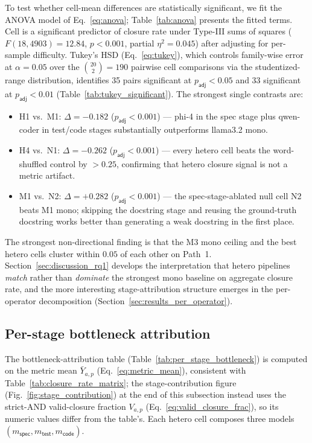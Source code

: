 

To test whether cell-mean differences are statistically significant, we fit the ANOVA model of Eq.~\ref{eq:anova}; Table~\ref{tab:anova} presents the fitted terms. Cell is a significant predictor of closure rate under Type-III sums of squares ($F(18, 4903) = 12.84$, $p < 0.001$, partial $\eta^2 = 0.045$) after adjusting for per-sample difficulty. Tukey's HSD (Eq.~\ref{eq:tukey}), which controls family-wise error at $\alpha = 0.05$ over the $\binom{20}{2} = 190$ pairwise cell comparisons via the studentized-range distribution, identifies 35 pairs significant at $p_{\textsf{adj}} < 0.05$ and 33 significant at $p_{\textsf{adj}} < 0.01$ (Table~\ref{tab:tukey_significant}). The strongest single contrasts are:



\begin{itemize}
  \item H1 vs.\ M1: $\Delta = -0.182$ ($p_{\textsf{adj}} < 0.001$) --- phi-4 in the spec stage plus qwen-coder in test/code stages substantially outperforms llama3.2 mono.
  \item H4 vs.\ N1: $\Delta = -0.262$ ($p_{\textsf{adj}} < 0.001$) --- every hetero cell beats the word-shuffled control by $> 0.25$, confirming that hetero closure signal is not a metric artifact.
  \item M1 vs.\ N2: $\Delta = +0.282$ ($p_{\textsf{adj}} < 0.001$) --- the spec-stage-ablated null cell N2 beats M1 mono; skipping the docstring stage and reusing the ground-truth docstring works better than generating a weak docstring in the first place.
\end{itemize}

The strongest non-directional finding is that the M3 mono ceiling and the best hetero cells cluster within $0.05$ of each other on Path~1. Section~\ref{sec:discussion_rq1} develops the interpretation that hetero pipelines \emph{match} rather than \emph{dominate} the strongest mono baseline on aggregate closure rate, and the more interesting stage-attribution structure emerges in the per-operator decomposition (Section~\ref{sec:results_per_operator}).

\subsection{Per-stage bottleneck attribution}
\label{sec:results_stage_attribution}

The bottleneck-attribution table (Table~\ref{tab:per_stage_bottleneck}) is computed on the metric mean $\bar{Y}_{a, p}$ (Eq.~\ref{eq:metric_mean}), consistent with Table~\ref{tab:closure_rate_matrix}; the stage-contribution figure (Fig.~\ref{fig:stage_contribution}) at the end of this subsection instead uses the strict-AND valid-closure fraction $V_{a, p}$ (Eq.~\ref{eq:valid_closure_frac}), so its numeric values differ from the table's. Each hetero cell composes three models $(m_{\textsf{spec}}, m_{\textsf{test}}, m_{\textsf{code}})$.


